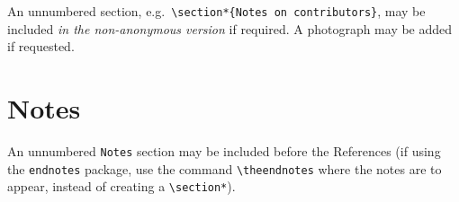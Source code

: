 \documentclass[]{interact}
\theoremstyle{plain}%
\theoremstyle{definition}
\theoremstyle{remark}
\begin{document}
An unnumbered section,
e.g.~\texttt{\textbackslash{}section*\{Notes\ on\ contributors\}}, may
be included \emph{in the non-anonymous version} if required. A
photograph may be added if requested.

\hypertarget{notes}{%
\section*{Notes}\label{notes}}

An unnumbered \texttt{Notes} section may be included before the
References (if using the \texttt{endnotes} package, use the command
\texttt{\textbackslash{}theendnotes} where the notes are to appear,
instead of creating a \texttt{\textbackslash{}section*}).






\end{document}
